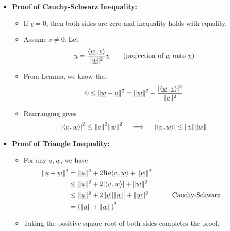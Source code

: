\documentclass[11pt,twoside]{report}
\newcommand{\vecnot}{\underline}
\newcommand{\Real}{\mathrm{Re}}
\newcommand{\inner}[2]{{\left\langle #1 \mskip2mu , #2 \right\rangle}}
\begin{document}
\begin{itemize}
\item \textbf{Proof of Cauchy-Schwarz Inequality:} 

\begin{itemize}
\item If $\vecnot{v} =0$, then both sides are zero and inequality holds with equality. 

\item Assume $\vecnot{v} \ne 0$. Let 
\begin{align*}
\vecnot{u} = \frac{ \inner{\vecnot{w}}{\vecnot{v}}}{ \| \vecnot{v}\|^2} \vecnot{v}   \qquad \text{(projection of $\vecnot{w}$ onto $\vecnot{v}$)}
\end{align*}
\item From Lemma, we know that 
\begin{align*}
0 \le \| \vecnot{w} - \vecnot{u} \|^2  = \| \vecnot{w}\|^2 - \frac{| \inner{\vecnot{w}}{\vecnot{v}}|^2}{ \| \vecnot{v}\|^2} 
\end{align*}
\item Rearranging gives
\[
\left| \inner{ \vecnot{v} }{ \vecnot{w} } \right|^2 \le \left\| \vecnot{v} \right\|^2 \left\| \vecnot{w} \right\|^2 \quad \implies \quad \left| \inner{ \vecnot{v} }{ \vecnot{w} } \right| \leq \left\| \vecnot{v} \right\| \left\| \vecnot{w} \right\| 
\]
\end{itemize}

\item \textbf{Proof of Triangle Inequality:} 
\begin{itemize}
\item For any $\vecnot{u}, \vecnot{w}$, we have
\begin{alignat*}{3}
\| \vecnot{u} + \vecnot{w} \|^2 & = \| \vecnot{u}  \|^2  + 2 \Real \inner{\vecnot{v}}{ \vecnot{w}}  + \| \vecnot{w} \|^2 \\
& \le  \| \vecnot{u}  \|^2  + 2 |\inner{\vecnot{v}}{ \vecnot{w}} |  + \| \vecnot{w} \|^2 \\
& \le  \| \vecnot{u}  \|^2  + 2\left\| \vecnot{v} \right\| \left\| \vecnot{w} \right\|   + \| \vecnot{w} \|^2 &\qquad & \text{Cauchy-Schwarz}\\
& = \left( \| \vecnot{u}  \| +\| \vecnot{w} \| \right)^2
\end{alignat*}
\item Taking the positive square root of both sides completes the proof. 
\end{itemize}


\end{itemize}
\end{document}
